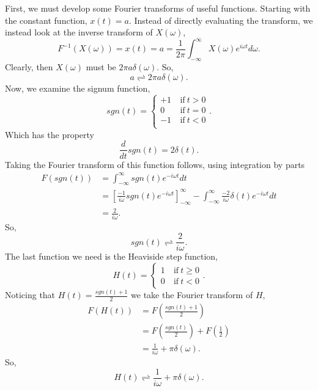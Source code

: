 \documentclass[12pt,twocolumn]{article}
\begin{document}
First, we must develop some Fourier transforms of useful functions. Starting with the constant function, $x(t)=a$. Instead of directly evaluating the transform, we instead look at the inverse transform of $X(\omega)$,
\begin{equation*}
F^{-1}(X(\omega))=x(t)=a=\frac{1}{2\pi}\int_{-\infty}^{\infty}X(\omega)e^{i\omega t}d\omega.
\end{equation*}
Clearly, then $X(\omega)$ must be $2\pi a\delta(\omega)$. So,
\begin{equation}
a\rightleftharpoons 2\pi a\delta(\omega).
\end{equation}
Now, we examine the signum function,
\begin{equation}
\mathit{sgn}(t) =
    \begin{cases}
    +1~&\mathrm{if}~t>0 \\
    0~&\mathrm{if}~t=0  \\
    -1~&\mathrm{if}~t<0 \\
    \end{cases}.
\end{equation}
Which has the property
\begin{equation}
\frac{d}{dt}\mathit{sgn}(t) = 2\delta(t).
\end{equation}
Taking the Fourier transform of this function follows, using integration by parts
\begin{equation*}
\begin{aligned}
F(\mathit{sgn}(t))&= \int_{-\infty}^{\infty}\mathit{sgn}(t)e^{-i\omega t}dt \\
&= \left[\frac{-1}{i\omega}\mathit{sgn}(t)e^{-i\omega t}\right]_{-\infty}^{\infty} - \int_{-\infty}^{\infty}\frac{-2}{i\omega}\delta(t)e^{-i\omega t}dt \\
&= \frac{2}{i\omega}.
\end{aligned}
\end{equation*}
So,
\begin{equation}
\mathit{sgn}(t)\rightleftharpoons\frac{2}{i\omega}.
\end{equation}
The last function we need is the Heaviside step function,
\begin{equation}
H(t) =
    \begin{cases}
    1~&\mathrm{if}~t\geq0 \\
    0~&\mathrm{if}~t<0
    \end{cases}.
\end{equation}
Noticing that $H(t)=\frac{\mathit{sgn}(t)+1}{2}$ we take the Fourier transform of $H$,
\begin{equation*}
\begin{aligned}
F(H(t))&=F\left(\frac{\mathit{sgn}(t)+1}{2}\right) \\
&=F\left(\frac{\mathit{sgn}(t)}{2}\right)+F\left(\frac{1}{2}\right) \\
&= \frac{1}{i\omega}+\pi\delta(\omega).
\end{aligned}
\end{equation*}
So,
\begin{equation}
H(t)\rightleftharpoons\frac{1}{i\omega}+\pi\delta(\omega).
\end{equation}
\end{document}
